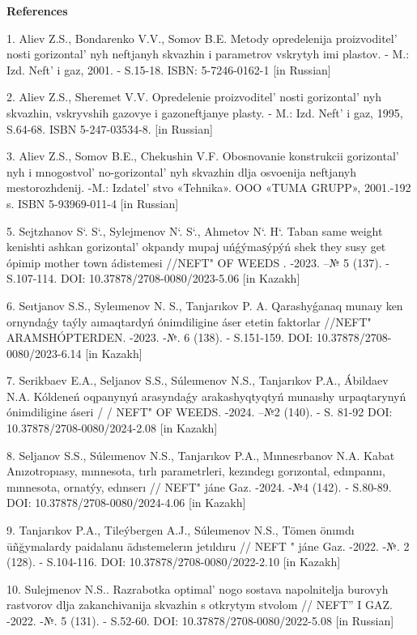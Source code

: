 \begin{center}
    {\bfseries References}
    \end{center}
    
    \begin{noparindent}

1. Aliev Z.S., Bondarenko V.V., Somov B.E. Metody opredelenija
proizvoditel' nosti gorizontal' nyh
neftjanyh skvazhin i parametrov vskrytyh imi plastov. - M.: Izd.
Neft'{} i gaz, 2001. - S.15-18. ISBN: 5-7246-0162-1 {[}in
Russian{]}

2. Aliev Z.S., Sheremet V.V. Opredelenie
proizvoditel' nosti gorizontal' nyh
skvazhin, vskryvshih gazovye i gazoneftjanye plasty. - M.: Izd.
Neft'{} i gaz, 1995, S.64-68. ISBN 5-247-03534-8. {[}in
Russian{]}

3. Aliev Z.S., Somov B.E., Chekushin V.F. Obosnovanie konstrukcii
gorizontal' nyh i
mnogostvol' no-gorizontal' nyh skvazhin
dlja osvoenija neftjanyh mestorozhdenij. -M.:
Izdatel' stvo «Tehnika». OOO «TUMA GRUPP», 2001.-192 s.
ISBN 5-93969-011-4 {[}in Russian{]}

5. Sejtzhanov S`. S`., Sylejmenov N`. S`., Ahmetov N`. H`. Taban same
weight kenishti ashkan gorizontal'{} okpandy mupaј
uńǵýmaѕýpýń shek they susy get ópimip mother town ádistemesi //NEFT" OF
WEEDS . -2023. --№ 5 (137). - S.107-114. DOI:
10.37878/2708-0080/2023-5.06 {[}in Kazakh{]}

6. Seıtjanov S.S., Syleımenov N. S., Tanjarıkov P. A. Qarashyǵanaq
munaıy ken ornyndaǵy taýly aımaqtardyń ónimdiligine áser etetin
faktorlar //NEFT" ARAMSHÓPTERDEN. -2023. -№. 6 (138). - S.151-159. DOI:
10.37878/2708-0080/2023-6.14 {[}in Kazakh{]}

7. Serikbaev E.A., Seljanov S.S., Súleımenov N.S., Tanjarıkov P.A.,
Ábildaev N.A. Kóldeneń oqpanynyń arasyndaǵy arakashyqtyqtyń munaıshy
urpaqtarynyń ónimdiligine áseri / / NEFT" OF WEEDS. -2024. --№2 (140). -
S. 81-92 DOI: 10.37878/2708-0080/2024-2.08 {[}in Kazakh{]}

8. Seljanov S.S., Súleımenov N.S., Tanjarıkov P.A., Mınnesrbanov N.A.
Kabat Anızotropıasy, mınnesota, tırlı parametrleri, kezındegı
gorızontal, edınpannı, mınnesota, ornatýy, edınserı // NEFT" jáne Gaz.
-2024. -№4 (142). - S.80-89. DOI: 10.37878/2708-0080/2024-4.06 {[}in
Kazakh{]}

9. Tanjarıkov P.A., Tileýbergen A.J., Súleımenov N.S., Tömen önımdı
ūñğymalardy paidalanu ädıstemelerın jetıldıru // NEFT " jáne Gaz. -2022.
-№. 2 (128). - S.104-116. DOI: 10.37878/2708-0080/2022-2.10 {[}in
Kazakh{]}

10. Sulejmenov N.S.. Razrabotka optimal' nogo sostava
napolnitelja burovyh rastvorov dlja zakanchivanija skvazhin s otkrytym
stvolom // NEFT''{} I GAZ. -2022. -№. 5
(131). - S.52-60. DOI: 10.37878/2708-0080/2022-5.08 {[}in Russian{]}
\end{noparindent}
